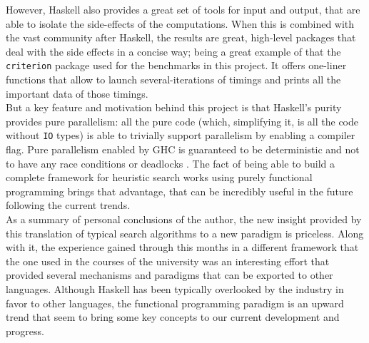 However, Haskell also provides a great set of tools for input and output, that
are able to isolate the side-effects of the computations. When this is combined
with the vast community after Haskell, the results are great, high-level
packages that deal with the side effects in a concise way; being a great
example of that the \texttt{criterion} package used for the benchmarks in this
project. It offers one-liner functions that allow to launch several-iterations
of timings and prints all the important data of those timings.\\

But a key feature and motivation behind this project is that Haskell's purity
provides pure parallelism: all the pure code (which, simplifying it, is all the
code without \texttt{IO} types) is able to trivially support parallelism by
enabling a compiler flag. Pure parallelism enabled by GHC is guaranteed to be
deterministic and not to have any race conditions or deadlocks \cite{ghc}. The
fact of being able to build a complete framework for heuristic search works
using purely functional programming brings that advantage, that can be
incredibly useful in the future following the current trends.\\


As a summary of personal conclusions of the author, the new insight provided by
this translation of typical search algorithms to a new paradigm is priceless.
Along with it, the experience gained through this months in a different
framework that the one used in the courses of the university was an interesting
effort that provided several mechanisms and paradigms that can be exported to
other languages. Although Haskell has been typically overlooked by the industry
in favor to other languages, the functional programming paradigm is an upward
trend that seem to bring some key concepts to our current development and
progress.\\

\newpage

